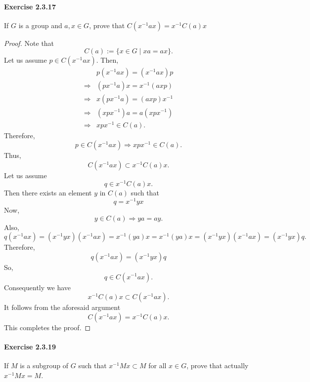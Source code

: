 \documentclass{article}
\begin{document}
\paragraph{Exercise 2.3.17} If $G$ is a group and $a, x \in G$, prove that $C\left(x^{-1} a x\right)=x^{-1} C(a) x$
\begin{proof}
    Note that
$$
C(a):=\{x \in G \mid x a=a x\} .
$$
Let us assume $p \in C\left(x^{-1} a x\right)$. Then,
$$
\begin{aligned}
& p\left(x^{-1} a x\right)=\left(x^{-1} a x\right) p \\
\Longrightarrow & \left(p x^{-1} a\right) x=x^{-1}(a x p) \\
\Longrightarrow & x\left(p x^{-1} a\right)=(a x p) x^{-1} \\
\Longrightarrow & \left(x p x^{-1}\right) a=a\left(x p x^{-1}\right) \\
\Longrightarrow & x p x^{-1} \in C(a) .
\end{aligned}
$$
Therefore,
$$
p \in C\left(x^{-1} a x\right) \Longrightarrow x p x^{-1} \in C(a) .
$$
Thus,
$$
C\left(x^{-1} a x\right) \subset x^{-1} C(a) x .
$$
Let us assume
$$
q \in x^{-1} C(a) x .
$$
Then there exists an element $y$ in $C(a)$ such that
$$
q=x^{-1} y x
$$
Now,
$$
y \in C(a) \Longrightarrow y a=a y .
$$
Also,
$$
q\left(x^{-1} a x\right)=\left(x^{-1} y x\right)\left(x^{-1} a x\right)=x^{-1}(y a) x=x^{-1}(y a) x=\left(x^{-1} y x\right)\left(x^{-1} a x\right)=\left(x^{-1} y x\right) q .
$$
Therefore,
$$
q\left(x^{-1} a x\right)=\left(x^{-1} y x\right) q
$$
So,
$$
q \in C\left(x^{-1} a x\right) .
$$
Consequently we have
$$
x^{-1} C(a) x \subset C\left(x^{-1} a x\right) .
$$
It follows from the aforesaid argument
$$
C\left(x^{-1} a x\right)=x^{-1} C(a) x .
$$
This completes the proof.
\end{proof}



\paragraph{Exercise 2.3.19} If $M$ is a subgroup of $G$ such that $x^{-1} M x \subset M$ for all $x \in G$, prove that actually $x^{-1} M x=M$. 
\end{document}
